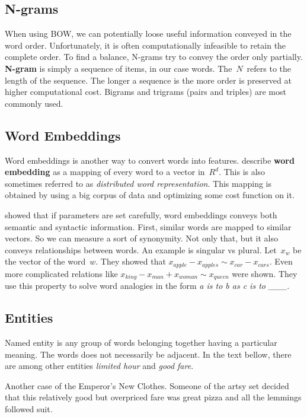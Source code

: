 \subsection{N-grams}

When using BOW, we can potentially loose useful information conveyed in the word order.
Unfortunately, it is often computationally infeasible to retain the complete order.
To find a balance, N-grams try to convey the order only partially.
\textbf{N-gram} is simply a sequence of items, in our case words. The~$N$~refers to the length of the sequence.
The longer a sequence is the more order is preserved at higher computational cost.
Bigrams and trigrams (pairs and triples) are most commonly used.

\subsection{Word Embeddings}
\label{subsec:wordembed}

Word embeddings is another way to convert words into features.
\citet{LeGo14} describe {\bf word embedding} as a mapping of every word to a vector in~$R^d$.
This is also sometimes referred to as \textit{distributed word representation}.
This mapping is obtained by using a big corpus of data and optimizing some cost function on it.

\citet{Mik13} showed that if parameters are set carefully, word embeddings conveys both semantic and syntactic information.
First, similar words are mapped to similar vectors. So we can measure a sort of synonymity.
Not only that, but it also conveys relationships between words.
An example is singular vs plural.
Let~$x_{w}$ be the vector of the word~$w$.
They showed that $x_{apple}-x_{apples} \sim x_{car}-x_{cars}$.
Even more complicated relations like $x_{king} - x_{man} + x_{woman} \sim x_{queen}$ were shown.
They use this property to solve word analogies in the form {\it a is to b as c is to \_\_\_}.


\subsection{Entities}

Named entity is any group of words belonging together having a particular meaning.
The words does not necessarily be adjacent.
In the text bellow, there are among other entities \textit{limited hour} and \textit{good fare}.

\begin{code}
Another case of the Emperor's New Clothes.
Someone of the artsy set decided that this relatively good
but overpriced fare was great pizza and all the lemmings followed suit.
\end{code}

